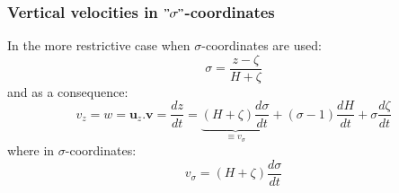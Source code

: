 \subsubsection{Vertical velocities in $"\sigma"$-coordinates}
In the more restrictive case when  $\sigma$-coordinates are used:
\begin{equation}
 \displaystyle
 \sigma=\frac{z-\zeta}{H+\zeta}
\end{equation}
and as a consequence:
\begin{equation}
 \displaystyle
 v_z=w=\mathbf{u}_z.\mathbf{v}
=\frac{dz}{dt}=\underbrace{(H+\zeta)\frac{d\sigma}{dt}}_{\equiv v_{\sigma}}
 +(\sigma-1)\frac{dH}{dt}
 +\sigma\frac{d\zeta}{dt}
\end{equation}
where in $\sigma$-coordinates:
\begin{equation}
 \displaystyle
v_{\sigma}=(H+\zeta)\frac{d\sigma}{dt}
\end{equation}

